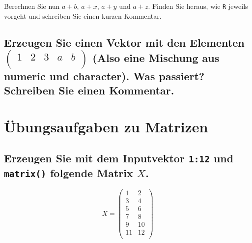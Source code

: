 \documentclass[12pt,a4paper]{article}
\begin{document}
Berechnen Sie nun \(a+b\), \(a+x\), \(a+y\) und \(a+z\). Finden Sie
heraus, wie \texttt{R} jeweils vorgeht und schreiben Sie einen kurzen
Kommentar.

\hypertarget{erzeugen-sie-einen-vektor-mit-den-elementen-beginpmatrix-1-2-3-a-b-endpmatrix-also-eine-mischung-aus-numeric-und-character.-was-passiert-schreiben-sie-einen-kommentar.}{%
\subsection{\texorpdfstring{Erzeugen Sie einen Vektor mit den Elementen
\(\begin{pmatrix} 1 & 2 & 3 & a & b \\ \end{pmatrix}\) (Also eine
Mischung aus numeric und character). Was passiert? Schreiben Sie einen
Kommentar.}{Erzeugen Sie einen Vektor mit den Elementen \textbackslash begin\{pmatrix\} 1 \& 2 \& 3 \& a \& b \textbackslash\textbackslash{} \textbackslash end\{pmatrix\} (Also eine Mischung aus numeric und character). Was passiert? Schreiben Sie einen Kommentar.}}\label{erzeugen-sie-einen-vektor-mit-den-elementen-beginpmatrix-1-2-3-a-b-endpmatrix-also-eine-mischung-aus-numeric-und-character.-was-passiert-schreiben-sie-einen-kommentar.}}

\vspace{1cm}

\hypertarget{uxfcbungsaufgaben-zu-matrizen}{%
\section{Übungsaufgaben zu
Matrizen}\label{uxfcbungsaufgaben-zu-matrizen}}

\hypertarget{erzeugen-sie-mit-dem-inputvektor-112-und-folgende-matrix-x.}{%
\subsection{\texorpdfstring{Erzeugen Sie mit dem Inputvektor
\texttt{1:12} und \texttt{matrix()} folgende Matrix
\(X\).}{Erzeugen Sie mit dem Inputvektor 1:12 und  folgende Matrix X.}}\label{erzeugen-sie-mit-dem-inputvektor-112-und-folgende-matrix-x.}}

\[X = \begin{pmatrix} 1 & 2 \\ 3 & 4\\ 5 & 6 \\ 7 & 8 \\
9 & 10 \\ 11 & 12 \\\end{pmatrix}\]
\end{document}
